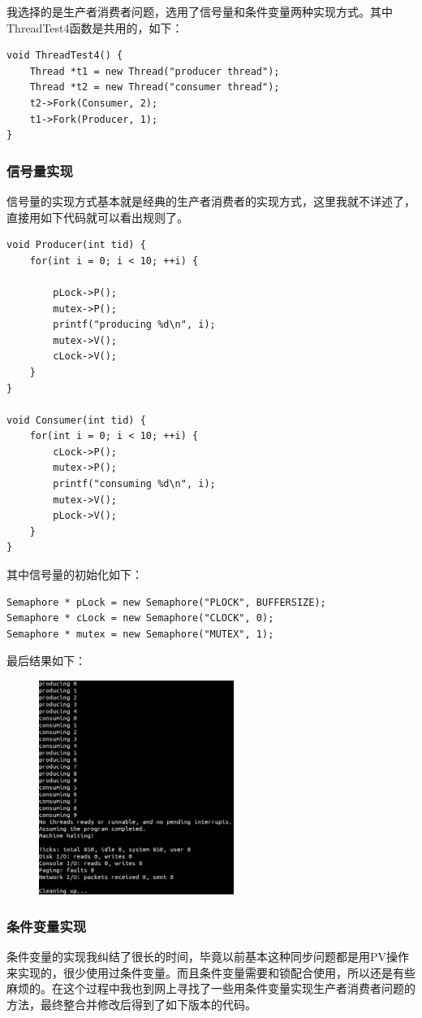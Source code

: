 \documentclass{ctexart}
\begin{document}
我选择的是生产者消费者问题，选用了信号量和条件变量两种实现方式。其中ThreadTest4函数是共用的，如下：
\begin{lstlisting}
void ThreadTest4() {
    Thread *t1 = new Thread("producer thread");
    Thread *t2 = new Thread("consumer thread");
    t2->Fork(Consumer, 2);
    t1->Fork(Producer, 1);
}
\end{lstlisting}

\subsubsection*{信号量实现}
信号量的实现方式基本就是经典的生产者消费者的实现方式，这里我就不详述了，直接用如下代码就可以看出规则了。
\begin{lstlisting}
void Producer(int tid) {
    for(int i = 0; i < 10; ++i) {

        pLock->P();
        mutex->P();
        printf("producing %d\n", i);
        mutex->V();
        cLock->V();
    }
}

void Consumer(int tid) {
    for(int i = 0; i < 10; ++i) {
        cLock->P();
        mutex->P();
        printf("consuming %d\n", i);
        mutex->V();
        pLock->V();
    }
}
\end{lstlisting}
其中信号量的初始化如下：
\begin{lstlisting}
Semaphore * pLock = new Semaphore("PLOCK", BUFFERSIZE);
Semaphore * cLock = new Semaphore("CLOCK", 0);
Semaphore * mutex = new Semaphore("MUTEX", 1);
\end{lstlisting}
最后结果如下：
\begin{figure}[h!]
\includegraphics[width=2.5in]{e30.png}
\end{figure}

\subsubsection*{条件变量实现}
条件变量的实现我纠结了很长的时间，毕竟以前基本这种同步问题都是用PV操作来实现的，很少使用过条件变量。而且条件变量需要和锁配合使用，所以还是有些麻烦的。在这个过程中我也到网上寻找了一些用条件变量实现生产者消费者问题的方法，最终整合并修改后得到了如下版本的代码。
\end{document}
